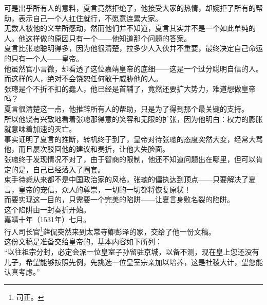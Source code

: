 \begin{multicols}{\theparacolNo}
可是出乎所有人的意料，夏言竟然拒绝了，他接受大家的热情，却婉拒了所有的帮助，表示自己一个人扛住就行，不愿意连累大家。\\

无数人被他的义举所感动，然而他们并不知道，夏言其实并不是一个如此单纯的人。他这样做的原因只有一个——他知道那个问题的答案。\\

夏言比张璁聪明得多，因为他很清楚，拉多少人入伙并不重要，最终决定自己命运的只有一个人——皇帝。\\

他虽然官小言微，却看透了这位嘉靖皇帝的底细——这是一个过分聪明自信的人。而这样的人，绝对不会饶恕任何敢于威胁他的人。\\

张璁是个不折不扣的蠢人，他已经是首辅了，竟然还要扩大势力，难道想做皇帝吗？\\

夏言很清楚这一点，他推辞所有人的帮助，只是为了得到那个最关键的支持。\\

所以他饶有兴致地看着张璁那得意的笑容和无限的扩张，因为他明白：权力的膨胀就意味着加速的灭亡。\\

事实证明了夏言的推断，转机终于到了，皇帝对待张璁的态度突然大变，经常大骂他，而且屡次驳回他的建议和奏折，让他大失脸面。\\

张璁终于发现情况不对了，由于智商的限制，他还不知道问题出在哪里，但可以肯定的是，自己已经落入了圈套。\\

束手待毙从来都不是中国政治家的风格，张璁的偏执达到顶点——只要解决了夏言，皇帝的宠信，众人的尊崇，一切的一切都将恢复原状！\\

而要实现这一目的，只需要一个完美的陷阱——让夏言身败名裂的陷阱。\\

这个陷阱由一封奏折开始。\\

嘉靖十年（1531年）七月。\\

行人司长官\footnote{司正。}薛侃突然来到太常寺卿彭泽的家，交给了他一份文稿。\\

这份文稿是准备交给皇帝的，基本内容如下所列：\\

“以往祖宗分封，必定会派一位皇室子孙留驻京城，以备不测，现在皇上您还没有儿子，希望能够按照先例，先挑选一位皇室宗亲加以培养，这是社稷大计，望您能认真考虑。”\\


\end{multicols}
